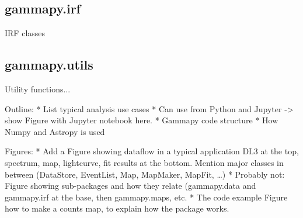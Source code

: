 \subsection{gammapy.irf}
IRF classes


\subsection{gammapy.utils}
Utility functions...


Outline:
* List typical analysis use cases
* Can use from Python and Jupyter -> show Figure with Jupyter notebook here.
* Gammapy code structure
* How Numpy and Astropy is used


Figures:
* Add a Figure showing dataflow in a typical application
DL3 at the top, spectrum, map, lightcurve, fit results at the bottom.
Mention major classes in between (DataStore, EventList, Map, MapMaker, MapFit, …)
* Probably not: Figure showing sub-packages and how they relate (gammapy.data and gammapy.irf at the base, then gammapy.maps, etc.
* The code example Figure how to make a counts map, to explain how the package works.
